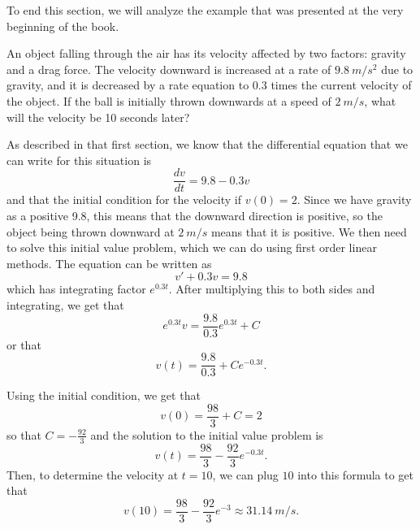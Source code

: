 \documentclass{ximera}
\begin{document}
To end this section, we will analyze the example that was presented at the very beginning of the book.

\begin{example}
    An object falling through the air has its velocity affected by two factors: gravity and a drag force. The velocity downward is increased at a rate of $9.8\ m/s^2$ due to gravity, and it is decreased by a rate equation to $0.3$ times the current velocity of the object. If the ball is initially thrown downwards at a speed of $2\ m/s$, what will the velocity be 10 seconds later?
\end{example}

\begin{exampleSol}
    As described in that first section, we know that the differential equation that we can write for this situation is
    \begin{equation*}
        \frac{dv}{dt} = 9.8 - 0.3v
    \end{equation*}
    and that the initial condition for the velocity if $v(0) = 2$. Since we have gravity as a positive 9.8, this means that the downward direction is positive, so the object being thrown downward at $2\ m/s$ means that it is positive. We then need to solve this initial value problem, which we can do using first order linear methods. The equation can be written as
    \begin{equation*}
        v' + 0.3v = 9.8
    \end{equation*} which has integrating factor $e^{0.3t}$. After multiplying this to both sides and integrating, we get that
    \begin{equation*}
        e^{0.3t}v = \frac{9.8}{0.3}e^{0.3t} + C
    \end{equation*} or that
    \begin{equation*}
        v(t) = \frac{9.8}{0.3} + Ce^{-0.3t}.
    \end{equation*}
    
    Using the initial condition, we get that
    \begin{equation*}
        v(0) = \frac{98}{3} + C = 2
    \end{equation*}
    so that $C = -\frac{92}{3}$ and the solution to the initial value problem is
    \begin{equation*}
        v(t) = \frac{98}{3} - \frac{92}{3}e^{-0.3t}.
    \end{equation*}
    Then, to determine the velocity at $t=10$, we can plug $10$ into this formula to get that
    \begin{equation*}
        v(10) = \frac{98}{3} - \frac{92}{3}e^{-3} \approx 31.14\ m/s.
    \end{equation*}
\end{exampleSol}
\end{document}
